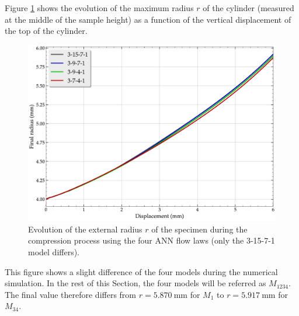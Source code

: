 \documentclass[algorithms,article,submit,pdftex,moreauthors]{Definitions/mdpi}
\begin{document}
Figure \ref{fig:radiusCurve} shows the evolution of the maximum radius $r$ of the cylinder (measured at the middle of the sample height) as a function of the vertical displacement of the top of the cylinder.
\begin{figure}[!ht]
\centering
\includegraphics[width=0.75\columnwidth]{Figures/radiusCurve}
\caption{Evolution of the external radius $r$ of the specimen during the compression process using the four ANN flow laws (only the 3-15-7-1 model differs).}
\label{fig:radiusCurve}
\end{figure}
This figure shows a slight difference of the four models during the numerical simulation.
In the rest of this Section, the four models will be referred as $M_{1234}$.
The final value therefore differs from $r=5.870~\text{mm}$ for $M_{1}$ to  $r=5.917~\text{mm}$ for $M_{34}$.
\end{document}
